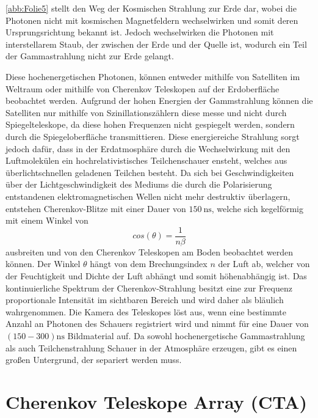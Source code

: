 \autoref{abb:Folie5} stellt den Weg der Kosmischen Strahlung zur Erde dar, wobei die Photonen nicht mit kosmischen Magnetfeldern wechselwirken
und somit deren Ursprungsrichtung bekannt ist. Jedoch wechselwirken die Photonen mit interstellarem Staub, der zwischen der Erde und der
Quelle ist, wodurch ein Teil der Gammastrahlung nicht zur Erde gelangt.

Diese hochenergetischen Photonen, können entweder mithilfe von Satelliten im Weltraum oder mithilfe von Cherenkov Teleskopen auf
der Erdoberfläche beobachtet werden.
Aufgrund der hohen Energien der Gammstrahlung können die Satelliten nur mithilfe von Szinillationszählern diese messe und nicht durch Spiegelteleskope,
da diese hohen Frequenzen nicht gespiegelt werden, sondern durch die Spiegeloberfläche transmittieren.
Diese energiereiche Strahlung sorgt jedoch dafür, dass in der Erdatmosphäre durch die Wechselwirkung mit den Luftmolekülen ein hochrelativistisches
Teilchenschauer ensteht, welches aus überlichtschnellen geladenen Teilchen besteht.
Da sich bei Geschwindigkeiten über der Lichtgeschwindigkeit des Mediums die durch die Polarisierung entstandenen elektromagnetischen Wellen
nicht mehr destruktiv überlagern, entstehen Cherenkov-Blitze mit einer Dauer von $\SI{150}{\nano\s}$\cite{Cherenkov_Licht}, welche sich kegelförmig
mit einem Winkel von
\begin{equation}
 cos(\theta) = \frac{1}{n\beta}
\end{equation}
ausbreiten und von den Cherenkov
Teleskopen am Boden beobachtet werden können.
Der Winkel $\theta$ hängt von dem Brechungsindex $n$ der Luft ab, welcher von der Feuchtigkeit und Dichte der Luft abhängt und somit höhenabhängig ist.
Das kontinuierliche Spektrum der Cherenkov-Strahlung besitzt eine zur Frequenz proportionale Intensität im sichtbaren Bereich und
wird daher als bläulich wahrgenommen.
Die Kamera des Teleskopes löst aus, wenn eine bestimmte Anzahl an Photonen des Schauers registriert wird und nimmt
für eine Dauer von $(150-300)\si{\nano\s}$ Bildmaterial auf.
Da sowohl hochenergetische Gammastrahlung als auch Teilchenstrahlung
Schauer in der Atmosphäre erzeugen, gibt es einen großen Untergrund, der separiert werden muss.

\section{Cherenkov Teleskope Array (CTA)}
\label{sec:CTA}

